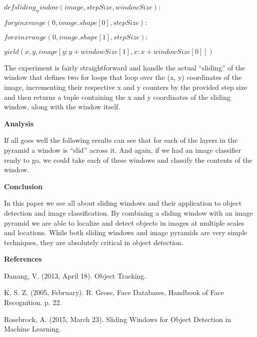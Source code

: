 \documentclass[12pt]{article}
\begin{document}
$def sliding_window(image, stepSize, windowSize):$

	$for y in xrange(0, image.shape[0], stepSize):$
	
		$for x in xrange(0, image.shape[1], stepSize):$
		
			$yield (x, y, image[y:y + windowSize[1], x:x + windowSize[0]])$

The experiment is fairly straightforward and handle the actual “sliding” of the window that defines two for  loops that loop over the (x, y) coordinates of the image, incrementing their respective  x  and  y  counters by the provided step size and then returns a tuple containing the x  and y  coordinates of the sliding window, along with the window itself.

\textbf{Analysis}

If all goes well the following results can see that for each of the layers in the pyramid a window is “slid” across it. And again, if we had an image classifier ready to go, we could take each of these windows and classify the contents of the window. 

\textbf{Conclusion}

In this paper we see all about sliding windows and their application to object detection and image classification. By combining a sliding window with an image pyramid we are able to localize and detect objects in images at multiple scales and locations. While both sliding windows and image pyramids are very simple techniques, they are absolutely critical in object detection.

\textbf{References}

Danang, V. (2013, April 18). Object Tracking.


K, S. Z. (2005, February). R. Gross, Face Databases, Handbook of Face Recognition. p. 22.


Rosebrock, A. (2015, March 23). Sliding Windows for Object Detection in Machine Learning.
\end{document}
